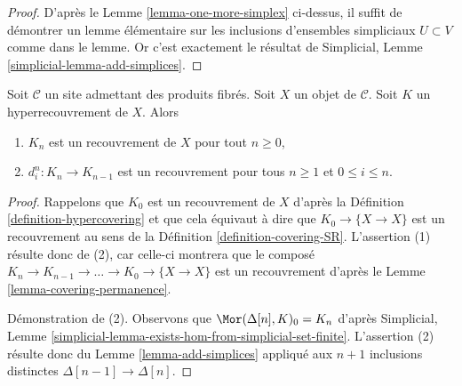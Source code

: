 \begin{proof}
D'après le Lemme \ref{lemma-one-more-simplex}
ci-dessus, il suffit de démontrer un lemme élémentaire
sur les inclusions d'ensembles simpliciaux $U \subset V$ comme dans le
lemme. Or c'est exactement le résultat de
Simplicial, Lemme \ref{simplicial-lemma-add-simplices}.
\end{proof}

\begin{lemma}
\label{lemma-degeneracy-maps-coverings}
Soit $\mathcal{C}$ un site admettant des produits fibrés. Soit $X$ un objet de
$\mathcal{C}$. Soit $K$ un hyperrecouvrement de $X$. Alors
\begin{enumerate}
\item $K_n$ est un recouvrement de $X$ pour tout $n \geq 0$,
\item $d^n_i : K_n \to K_{n - 1}$ est un recouvrement pour tous $n \geq 1$
et $0 \leq i \leq n$.
\end{enumerate}
\end{lemma}

\begin{proof}
Rappelons que $K_0$ est un recouvrement de $X$ d'après la
Définition \ref{definition-hypercovering}
et que cela équivaut à dire que
$K_0 \to \{X \to X\}$ est un recouvrement au sens
de la Définition \ref{definition-covering-SR}.
L'assertion (1) résulte donc de (2), car celle-ci montrera que
le composé
$K_n \to K_{n - 1} \to \ldots \to K_0 \to \{X \to X\}$
est un recouvrement d'après le Lemme \ref{lemma-covering-permanence}.

\medskip\noindent
Démonstration de (2). Observons que
$\Mor(\Delta[n], K)_0 = K_n$ d'après
Simplicial, Lemme \ref{simplicial-lemma-exists-hom-from-simplicial-set-finite}.
L'assertion (2) résulte donc du Lemme \ref{lemma-add-simplices}
appliqué aux $n + 1$ inclusions distinctes $\Delta[n - 1] \to \Delta[n]$.
\end{proof}

